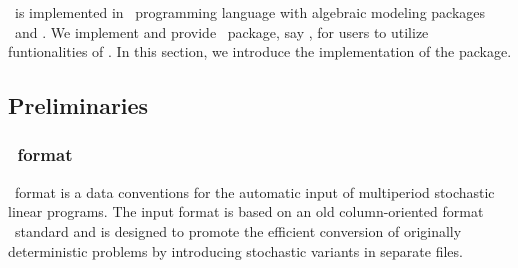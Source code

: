 \siplibtwo\ is implemented in \julia\ programming language with algebraic modeling packages \jump\ and \structjump. We implement and provide \julia\ package, say \siplibjl, for users to utilize funtionalities of \siplibtwo. In this section, we introduce the implementation of the package.

\subsection{Preliminaries}
\subsubsection{\smps\ format} \label{subsec:smps}
\smps\ format \cite{SMPS} is a data conventions for the automatic input of multiperiod stochastic linear programs. The input format is based on an old column-oriented format \mpsx\ standard and is designed to promote the efficient conversion of originally deterministic problems by introducing stochastic variants in separate files. 

